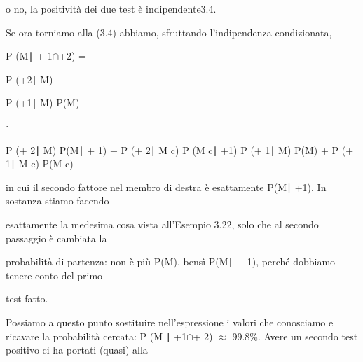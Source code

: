 \documentclass[a4paper,portrait,12pt]{article}
\begin{document}
\begin{flushleft}
o no, la positivit\`{a} dei due test \`{e} indipendente3.4.
\end{flushleft}


\begin{flushleft}
Se ora torniamo alla (3.4) abbiamo, sfruttando l'indipendenza condizionata,
\end{flushleft}


\begin{flushleft}
P (M∣ + 1$\cap$+2) =
\end{flushleft}





\begin{flushleft}
P (+2∣ M)
\end{flushleft}


\begin{flushleft}
P (+1∣ M) P(M)
\end{flushleft}


⋅


\begin{flushleft}
P (+ 2∣ M) P(M∣ + 1) + P (+ 2∣ M c) P (M c∣ +1) P (+ 1∣ M) P(M) + P (+ 1∣ M c) P(M c)
\end{flushleft}





\begin{flushleft}
in cui il secondo fattore nel membro di destra \`{e} esattamente P(M∣ +1). In sostanza stiamo facendo
\end{flushleft}


\begin{flushleft}
esattamente la medesima cosa vista all'Esempio 3.22, solo che al secondo passaggio \`{e} cambiata la
\end{flushleft}


\begin{flushleft}
probabilit\`{a} di partenza: non \`{e} più P(M), bensì P(M∣ + 1), perch\'{e} dobbiamo tenere conto del primo
\end{flushleft}


\begin{flushleft}
test fatto.
\end{flushleft}


\begin{flushleft}
Possiamo a questo punto sostituire nell'espressione i valori che conosciamo e ricavare la probabilit\`{a} cercata: P (M ∣ +1$\cap$+ 2) $\approx$ 99.8\%. Avere un secondo test positivo ci ha portati (quasi) alla
\end{flushleft}
\end{document}
